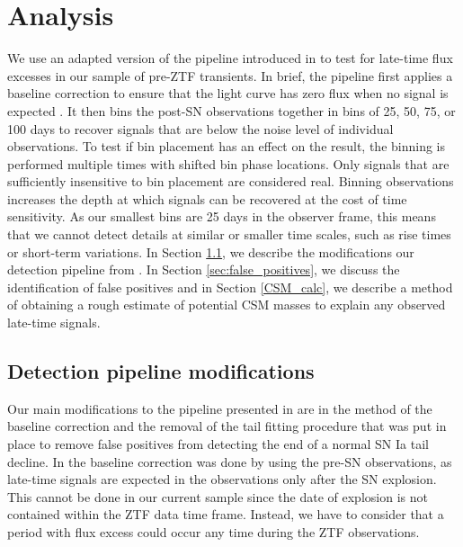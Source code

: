 \documentclass[a4paper,oneside,12pt, class=Latex/Classes/PhDthesisPSnPDF, crop=false]{standalone}
\begin{document}
\section{Analysis}
\label{Pre-ZTF_analysis}
We use an adapted version of the pipeline introduced in \citet{Terwel_2024_paper1} to test for late-time flux excesses in our sample of pre-ZTF transients. In brief, the pipeline first applies a baseline correction to ensure that the light curve has zero flux when no signal is expected \citep[e.g.][]{Yao_baseline_corr,Miller_baseline_corr}. It then bins the post-SN observations together in bins of 25, 50, 75, or 100 days to recover signals that are below the noise level of individual observations. To test if bin placement has an effect on the result, the binning is performed multiple times with shifted bin phase locations. Only signals that are sufficiently insensitive to bin placement are considered real. Binning observations increases the depth at which signals can be recovered at the cost of time sensitivity. As our smallest bins are 25 days in the observer frame, this means that we cannot detect details at similar or smaller time scales, such as rise times or short-term variations. In Section \ref{sec:Pipeline_modifications}, we describe the modifications our detection pipeline from \cite{Terwel_2024_paper1}. In Section \ref{sec:false_positives}, we discuss the identification of false positives and in Section \ref{CSM_calc}, we describe a method of obtaining a rough estimate of potential CSM masses to explain any observed late-time signals.

\subsection{Detection pipeline modifications}
\label{sec:Pipeline_modifications}
Our main modifications to the pipeline presented in  \citet{Terwel_2024_paper1} are in the method of the baseline correction and the removal of the tail fitting procedure that was put in place to remove false positives from detecting the end of a normal SN Ia tail decline. In \citet{Terwel_2024_paper1} the baseline correction was done by using the pre-SN observations, as late-time signals are expected in the observations only after the SN explosion. This cannot be done in our current sample since the date of explosion is not contained within the ZTF data time frame. Instead, we have to consider that a period with flux excess could occur any time during the ZTF observations. 
\end{document}
